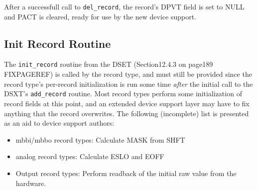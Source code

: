 After a successfull call to \verb|del_record|, the record's DPVT field is set to NULL and PACT is cleared, ready for use by 
the new device support.

\subsection{Init Record Routine}

The \verb|init_record| routine from the DSET (Section12.4.3 on page189 FIXPAGEREF) is called by the record type, and must still be 
provided since the record type's per-record initialization is run some time \emph{after} the initial call to the DSXT's 
\verb|add_record| routine. Most record types perform some initialization of record fields at this point, and an extended device 
support layer may have to fix anything that the record overwrites. The following (incomplete) list is presented as an aid to 
device support authors:

\begin{itemize}
\item mbbi/mbbo record types: Calculate MASK from SHFT

\item analog record types: Calculate ESLO and EOFF

\item Output record types: Perform readback of the initial raw value from the hardware.

\end{itemize}








